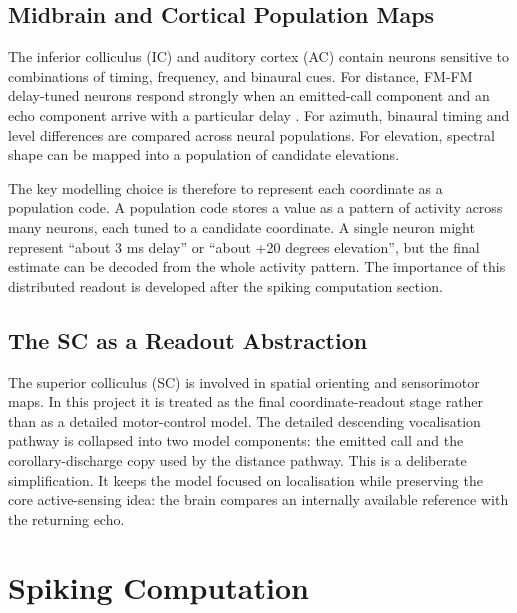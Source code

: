 \subsection{Midbrain and Cortical Population Maps}

The inferior colliculus (IC) and auditory cortex (AC) contain neurons sensitive to combinations of timing, frequency, and binaural cues. For distance, FM-FM delay-tuned neurons respond strongly when an emitted-call component and an echo component arrive with a particular delay \cite{Suga2015NeuralBat,Suzuki2017AcuityBats}. For azimuth, binaural timing and level differences are compared across neural populations. For elevation, spectral shape can be mapped into a population of candidate elevations.

The key modelling choice is therefore to represent each coordinate as a population code. A population code stores a value as a pattern of activity across many neurons, each tuned to a candidate coordinate. A single neuron might represent ``about 3 ms delay'' or ``about +20 degrees elevation'', but the final estimate can be decoded from the whole activity pattern. The importance of this distributed readout is developed after the spiking computation section.

\subsection{The SC as a Readout Abstraction}

The superior colliculus (SC) is involved in spatial orienting and sensorimotor maps. In this project it is treated as the final coordinate-readout stage rather than as a detailed motor-control model. The detailed descending vocalisation pathway is collapsed into two model components: the emitted call and the corollary-discharge copy used by the distance pathway. This is a deliberate simplification. It keeps the model focused on localisation while preserving the core active-sensing idea: the brain compares an internally available reference with the returning echo.

\section{Spiking Computation}

